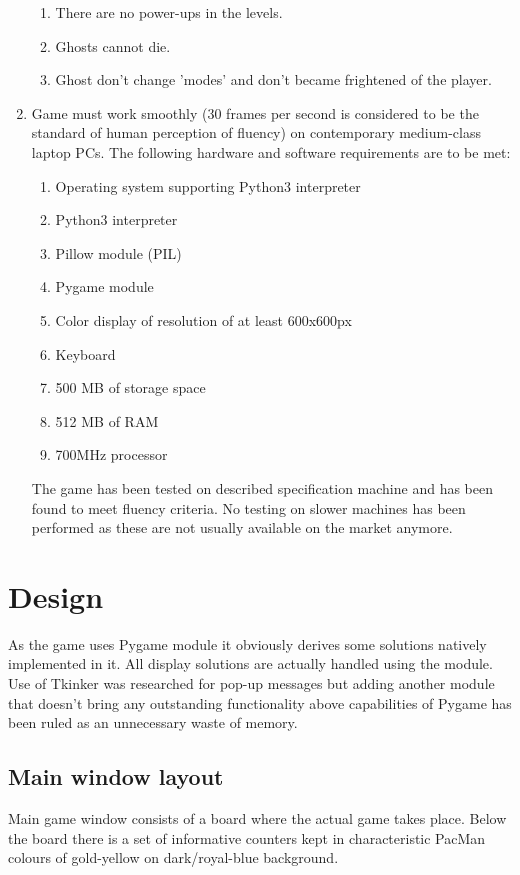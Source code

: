 \documentclass[11pt,a4paper]{report}
\begin{document}
\begin{enumerate}
\begin{enumerate}
					\item
						There are no power-ups in the levels.
					\item
						Ghosts cannot die.
					\item
						Ghost don't change 'modes' and don't became frightened of the player.
					\end{enumerate}
				\item
					Game must work smoothly (30 frames per second is considered to be the standard of human perception of fluency) on contemporary medium-class laptop PCs. The following hardware and software requirements are to be met:
					\begin{enumerate}
						\item
							Operating system supporting Python3 interpreter
						\item
							Python3 interpreter
						\item
							Pillow module (PIL)
						\item
							Pygame module
						\item
							Color display of resolution of at least 600x600px
						\item
							Keyboard
						\item
							500 MB of storage space
						\item
							512 MB of RAM
						\item
							700MHz processor
					\end{enumerate}
					The game has been tested on described specification machine and has been found to meet fluency criteria. No testing on slower machines has been performed as these are not usually available on the market anymore.
			\end{enumerate}
			
	\chapter{Design}
		\newpage
		As the game uses Pygame module it obviously derives some solutions natively implemented in it. All display solutions are actually handled using the module. Use of Tkinker was researched for pop-up messages but adding another module that doesn't bring any outstanding functionality above capabilities of Pygame has been ruled as an unnecessary waste of memory.
		\section{Main window layout}
			Main game window consists of a board where the actual game takes place.
			Below the board there is a set of informative counters kept in characteristic PacMan colours of gold-yellow on dark/royal-blue background.
\end{document}
